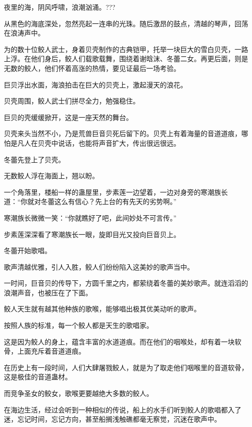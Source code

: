 
\begin{this_body}

夜里的海，阴风呼啸，浪潮汹涌。???

从黑色的海底深处，忽然亮起一连串的光珠。随后激昂的鼓点，清越的琴声，回荡在浪涛声中。

为的数十位鲛人武士，身着贝壳制作的古典铠甲，托举一块巨大的雪白贝壳，一路上浮。在他们身后，鲛人们载歌载舞，围绕着谢晗沫、冬蕾二女。再更后面，则是无数的鲛人，他们怀着高涨的热情，要见证最后一场考验。

巨贝浮出水面，海浪拍击在巨大的贝壳上，激起漫天的浪花。

贝壳周围，鲛人武士们拼尽全力，勉强稳住。

巨贝的壳缓缓掀开，这是一座天然的舞台。

贝壳来头当然不小，乃是荒兽巨音贝死后留下的。贝壳上有着海量的音道道痕，哪怕是凡人在贝壳中说话，也能将声音扩大，传出很远很远。

冬蕾先登上了贝壳。

无数鲛人浮在海面上，翘以盼。

一个角落里，楼船一样的蛊屋里，步素莲一边望着，一边对身旁的寒潮族长道：“你就对冬蕾这么有信心？先上台的有先天的劣势啊。”

寒潮族长微微一笑：“你就瞧好了吧，此间妙处不可言传。”

步素莲深深看了寒潮族长一眼，旋即目光又投向巨音贝上。

冬蕾开始歌唱。

歌声清越优雅，引人入胜，鲛人们纷纷陷入这美妙的歌声当中。

一时间，巨音贝的传导下，方圆千里之内，都萦绕着冬蕾的美妙歌声。就连滔滔的浪潮声音，也被压在了下面。

鲛人天生就有越其他种族的歌喉，能够唱出极其优美动听的歌声。

按照人族的标准，每一个鲛人都是天生的歌唱家。

这是因为鲛人的身上，蕴含丰富的水道道痕。而在他们的咽喉处，却有着一块软骨，上面充斥着音道道痕。

在历史上有一段时间，人们大肆屠戮鲛人，就是为了取走他们咽喉里的音道软骨，这是极佳的音道蛊材。

而竞争圣女的鲛女，歌喉更要越绝大多数的鲛人。

在海边生活，经过会听到一种相似的传说，船上的水手们听到鲛人的歌唱都入了迷，忘记时间，忘记方向，甚至船搁浅触礁都毫无察觉，沉迷在歌声中。


\end{this_body}
